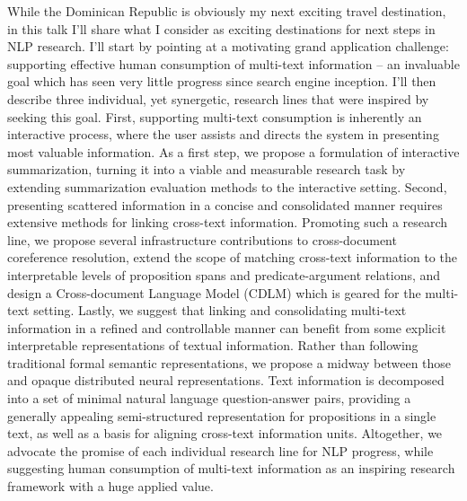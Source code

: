 While the Dominican Republic is obviously my next exciting travel destination, in this talk I'll share what I consider as exciting destinations for next steps in NLP research. I'll start by pointing at a motivating grand application challenge: supporting effective human consumption of multi-text information -- an invaluable goal which has seen very little progress since search engine inception. I'll then describe three individual, yet synergetic, research lines that were inspired by seeking this goal. First, supporting multi-text consumption is inherently an interactive process, where the user assists and directs the system in presenting most valuable information. As a first step, we  propose a formulation of interactive summarization, turning it into a viable and measurable research task by extending summarization evaluation methods to the interactive setting. Second, presenting scattered information in a concise and consolidated manner requires extensive methods for linking cross-text information. Promoting such a  research line, we propose several infrastructure contributions to cross-document coreference resolution, extend the scope of matching cross-text information to the interpretable levels of proposition spans and predicate-argument relations, and design a Cross-document Language Model (CDLM) which is geared for the multi-text
 setting. Lastly, we suggest that linking and consolidating multi-text information in a refined and controllable manner can benefit from some explicit interpretable representations of textual information. Rather than following traditional formal semantic representations, we propose a midway between those and opaque distributed neural representations. Text information is decomposed into a set of minimal natural language question-answer pairs, providing a generally appealing semi-structured representation for propositions in a single text, as well as a basis for aligning cross-text information units. Altogether, we advocate the promise of each individual research line for NLP progress, while suggesting human consumption of multi-text information as an inspiring research framework with a huge applied value.

\vspace{3em}\par

\vfill
\noindent

